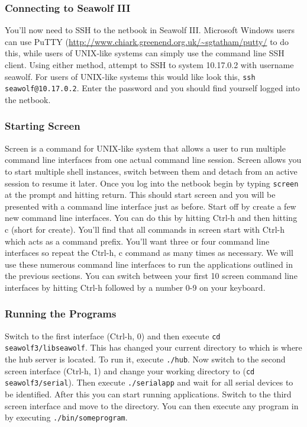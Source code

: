 \subsubsection{Connecting to Seawolf III} \label{runningsw3ssh}
You'll now need to SSH to the netbook in Seawolf III. Microsoft Windows users
can use PuTTY (\url{http://www.chiark.greenend.org.uk/~sgtatham/putty/} to do
this, while users of UNIX-like systems can simply use the command line SSH
client. Using either method, attempt to SSH to system 10.17.0.2 with username
seawolf. For users of UNIX-like systems this would like look this, \texttt{ssh
  seawolf@10.17.0.2}. Enter the password and you should find yourself logged
into the netbook.

\subsubsection{Starting Screen}
Screen is a command for UNIX-like system that allows a user to run multiple
command line interfaces from one actual command line session. Screen allows you
to start multiple shell instances, switch between them and detach from an active
session to resume it later. Once you log into the netbook begin by typing
\texttt{screen} at the prompt and hitting return. This should start screen and
you will be presented with a command line interface just as before. Start off by
create a few new command line interfaces. You can do this by hitting Ctrl-h and
then hitting c (short for create). You'll find that all commands in screen start
with Ctrl-h which acts as a command prefix. You'll want three or four command
line interfaces so repeat the Ctrl-h, c command as many times as necessary. We
will use these numerous command line interfaces to run the applications outlined
in the previous sections. You can switch between your first 10 screen command
line interfaces by hitting Ctrl-h followed by a number 0-9 on your keyboard.

\subsubsection{Running the Programs}
Switch to the first interface (Ctrl-h, 0) and then execute \texttt{cd
  seawolf3/\newline{}libseawolf}. This has changed your current directory to
 which is where the hub server is located. To run
it, execute \texttt{./hub}. Now switch to the second screen interface (Ctrl-h,
1) and change your working directory to  (\texttt{cd
  seawolf3/serial}). Then execute \texttt{./serialapp} and wait for all serial
devices to be identified. After this you can start running applications. Switch
to the third screen interface and move to the 
directory. You can then execute any program in  by executing
\texttt{./bin/someprogram}.

